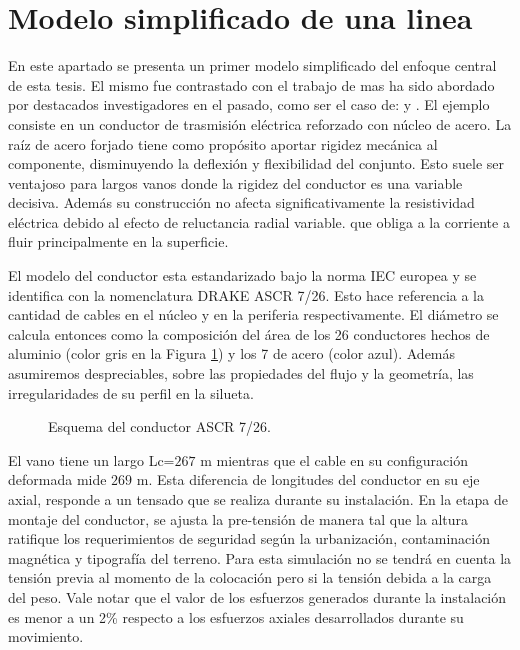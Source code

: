 \clearpage


\section{Modelo simplificado de una linea}\label{Sec:RN:FotiCable}
En este apartado se presenta un primer modelo simplificado del enfoque central de esta tesis. El mismo fue contrastado con el trabajo de \cite{foti2018finite} mas ha sido abordado por destacados investigadores en el pasado, como ser el caso de: \cite{luongo1998non} y \cite{martinelli2001numerical}. El ejemplo consiste en un conductor de trasmisión eléctrica reforzado con núcleo de acero. La raíz de acero forjado tiene como propósito aportar rigidez mecánica al componente, disminuyendo la deflexión y flexibilidad del conjunto. Esto suele ser ventajoso para largos vanos donde la rigidez del conductor es una variable decisiva. Además su construcción no afecta significativamente la resistividad eléctrica debido al efecto de reluctancia radial variable. que obliga a la corriente a fluir principalmente en la superficie. 

El modelo del conductor esta estandarizado bajo la norma IEC europea \cite{IEC6081} y se identifica con la nomenclatura DRAKE ASCR 7/26. Esto hace referencia a la cantidad de cables en el núcleo y en la periferia respectivamente. El diámetro se calcula entonces como la composición del área de los 26 conductores hechos de aluminio (color gris en la Figura 	\ref{fig:RN:FotiCable:Perfil}) y los 7 de acero (color azul).  Además asumiremos despreciables, sobre las propiedades del flujo y la geometría, las irregularidades de su perfil en la silueta. 

\begin{figure}[htbp]
	\centering
	\def\svgwidth{80mm}
	
	\caption{Esquema del conductor  ASCR 7/26.}
	\label{fig:RN:FotiCable:Perfil}
\end{figure}



El vano tiene un largo Lc=$267$ m mientras que el cable en su configuración deformada mide $269$ m.  Esta diferencia de longitudes del conductor en su eje axial, responde a un tensado que se realiza durante su instalación. En la etapa de montaje del conductor, se ajusta la pre-tensión de manera tal que la altura ratifique los requerimientos de seguridad según la urbanización, contaminación magnética y tipografía del terreno. Para esta simulación no se tendrá en cuenta la tensión previa al momento de la colocación pero si la tensión debida a la carga del peso. Vale notar que el valor de los esfuerzos generados durante la instalación es menor a un 2\% respecto a los esfuerzos axiales desarrollados durante su movimiento. 

